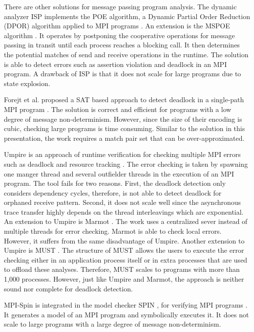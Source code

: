 There are other solutions for message passing program analysis.
The dynamic analyzer ISP implements the POE algorithm, a Dynamic Partial Order Reduction (DPOR) algorithm \cite{DBLP:conf/popl/FlanaganG05} applied to MPI programs \cite{DBLP:conf/ppopp/VakkalankaSGK08}. 
An extension is the MSPOE algorithm \cite{DBLP:conf/sbmf/SharmaGB12}. It operates by postponing the cooperative operations for message passing in transit until each process reaches a blocking call. It then determines the potential matches of send and receive operations in the runtime. The solution is able to detect errors such as assertion violation and deadlock in an MPI program.
A drawback of ISP is that it does not scale for large programs due to state explosion.

Forejt et al. proposed a SAT based approach to detect deadlock in a single-path MPI program \cite{DBLP:conf/fm/ForejtKNS14}. The solution is correct and efficient for programs with a low degree of message non-determinism. However, since the size of their encoding is cubic, checking large programs is time consuming. Similar to the solution in this presentation, the work requires a match pair set that can be over-approximated.

Umpire is an approach of runtime verification for checking multiple MPI errors such as deadlock and resource tracking \cite{DBLP:conf/sc/VetterS00}. The error checking is taken by spawning one manger thread and several outfielder threads in the execution of an MPI program. The tool fails for two reasons. First, the deadlock detection only considers dependency cycles, therefore, is not able to detect deadlock for orphaned receive pattern. Second, it does not scale well since the asynchronous trace transfer highly depends on the thread interleavings which are exponential. An extension to Umpire is Marmot \cite{DBLP:conf/parco/KrammerBMR03}. The work uses a centralized sever instead of multiple threads for error checking. Marmot is able to check local errors. However, it suffers from the same disadvantage of Umpire. Another extension to Umpire is MUST \cite{DBLP:conf/ptw/HilbrichSSM09}. The structure of MUST allows the users to execute the error checking either in an application process itself or in extra processes that are used to offload these analyses. Therefore, MUST scales to programs with more than 1,000 processes. However, just like Umpire and Marmot, the approach is neither sound nor complete for deadlock detection. 


MPI-Spin is integrated in the model checker SPIN \cite{DBLP:journals/tse/Holzmann97}, for verifying MPI programs \cite{DBLP:conf/vmcai/Siegel07,DBLP:conf/pvm/Siegel07}. It generates a model of an MPI program and symbolically executes it. It does not scale to large programs with a large degree of message non-determinism.

